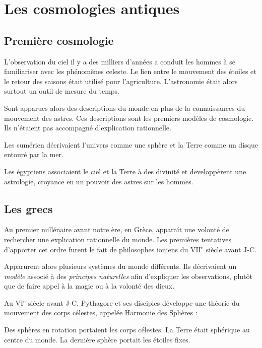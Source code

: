 
\section{Les cosmologies antiques}


  \subsection{Première cosmologie}

\begin{center}

\end{center}

L'observation du ciel il y a des milliers d'années a conduit les hommes à se familiariser avec les phénomènes celeste.
 Le lien entre le mouvement des étoiles et le retour des saisons était utilisé pour l'agriculture.
 L'astronomie était alors surtout un outil de mesure du temps.

 Sont apparues alors des descriptions du monde en plus de la connaissances du mouvement des astres.
Ces descriptions sont les premiers modèles de cosmologie. Ils n'étaient pas accompagné d'explication rationnelle.

Les sumérien décrivaient l'univers comme une sphère et la Terre comme un disque entouré par la mer. 

\begin{center}

\end{center}

Les égyptiens associaient le ciel et la Terre à des divinité et developpèrent une astrologie, croyance en un pouvoir des astres sur les hommes.

  \subsection{Les grecs}
Au premier millénaire avant notre ère, en Grèce, apparaît une volonté de rechercher une explication rationnelle du monde.
Les premières tentatives d'apporter cet ordre furent le fait de philosophes ioniens du {\footnotesize VII}$^\text{e}$ siècle avant J-C.

Apparurent alors plusieurs systèmes du monde différents. Ils décrivaient un {\it modèle} associé à des {\it principes naturelles} afin d'expliquer les observations, plutôt que de faire appel à la magie ou à la volonté des dieux. 

Au {\footnotesize VI}$^\text{e}$ siècle avant J-C, Pythagore et ses disciples développe une théorie du mouvement des corps célestes, appelée Harmonie des Sphères :

Des sphères en rotation portaient les corps célestes. La Terre était sphérique au centre du monde. La dernière sphère portait les étoiles fixes.





